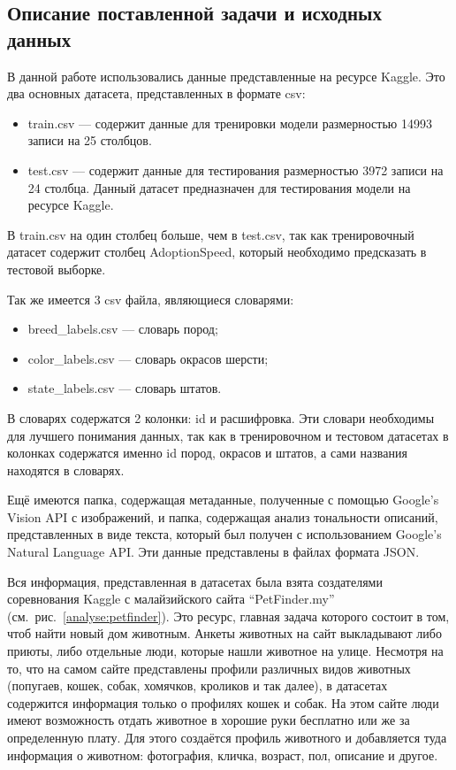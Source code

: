 \documentclass[14pt]{mmcs_article}
\begin{document}
\subsection{Описание поставленной задачи и исходных данных}

В данной работе использовались данные представленные на ресурсе Kaggle.  Это два основных датасета, представленных в формате csv:

\begin{itemize}
	\item train.csv --- содержит данные для тренировки модели размерностью 14993 записи на 25 столбцов.
	\item test.csv --- содержит данные для тестирования размерностью 3972 записи на 24 столбца. Данный датасет предназначен для тестирования модели на ресурсе Kaggle.
\end{itemize}

В train.csv на один столбец больше, чем в test.csv, так как тренировочный датасет содержит столбец AdoptionSpeed, который необходимо предсказать в тестовой выборке.

Так же имеется 3 csv файла, являющиеся словарями:

\begin{itemize}
	\item breed\_labels.csv --- словарь пород;
	\item color\_labels.csv --- словарь окрасов шерсти;
	\item state\_labels.csv --- словарь штатов.
\end{itemize}

В словарях содержатся 2 колонки: id и расшифровка. Эти словари необходимы для лучшего понимания данных, так как в тренировочном и тестовом датасетах в колонках содержатся именно id пород, окрасов и штатов, а сами названия находятся в словарях.

Ещё имеются папка, содержащая метаданные, полученные с помощью Google’s Vision API с изображений, и папка, содержащая анализ тональности описаний, представленных в виде текста, который был получен с использованием Google’s Natural Language API. Эти данные представлены в файлах формата JSON.

Вся информация, представленная в датасетах была взята создателями соревнования Kaggle с малайзийского сайта ``PetFinder.my'' (см.~рис.~\ref{analyse:petfinder}). Это ресурс, главная задача которого состоит в том, чтоб найти новый дом животным. Анкеты животных на сайт выкладывают либо приюты, либо отдельные люди, которые нашли животное на улице. Несмотря на то, что на самом сайте представлены профили различных видов животных (попугаев, кошек, собак, хомячков, кроликов и так далее), в датасетах содержится информация только о профилях кошек и собак. На этом сайте люди имеют возможность отдать животное в хорошие руки бесплатно или же за определенную плату. Для этого создаётся профиль животного и добавляется туда информация о животном: фотография, кличка, возраст, пол, описание и другое.
\end{document}
